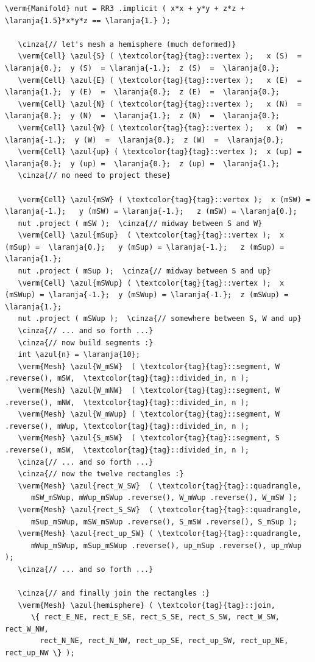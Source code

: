 \begin{Verbatim}[commandchars=\\\{\},formatcom=\small\tt,frame=single,
   label=parag-\ref{\numb section 2.\numb parag 7}.cpp,rulecolor=\color{moldura},
   baselinestretch=0.94,framesep=2mm]
   \verm{Manifold} nut = RR3 .implicit ( x*x + y*y + z*z + \laranja{1.5}*x*y*z == \laranja{1.} );

   \cinza{// let's mesh a hemisphere (much deformed)}
   \verm{Cell} \azul{S} ( \textcolor{tag}{tag}::vertex );   x (S)  =  \laranja{0.};  y (S)  = \laranja{-1.};  z (S)  =  \laranja{0.};
   \verm{Cell} \azul{E} ( \textcolor{tag}{tag}::vertex );   x (E)  =  \laranja{1.};  y (E)  =  \laranja{0.};  z (E)  =  \laranja{0.};
   \verm{Cell} \azul{N} ( \textcolor{tag}{tag}::vertex );   x (N)  =  \laranja{0.};  y (N)  =  \laranja{1.};  z (N)  =  \laranja{0.};
   \verm{Cell} \azul{W} ( \textcolor{tag}{tag}::vertex );   x (W)  = \laranja{-1.};  y (W)  =  \laranja{0.};  z (W)  =  \laranja{0.};
   \verm{Cell} \azul{up} ( \textcolor{tag}{tag}::vertex );  x (up) =  \laranja{0.};  y (up) =  \laranja{0.};  z (up) =  \laranja{1.};
   \cinza{// no need to project these}

   \verm{Cell} \azul{mSW} ( \textcolor{tag}{tag}::vertex );  x (mSW) = \laranja{-1.};   y (mSW) = \laranja{-1.};   z (mSW) = \laranja{0.};
   nut .project ( mSW );  \cinza{// midway between S and W}
   \verm{Cell} \azul{mSup}  ( \textcolor{tag}{tag}::vertex );  x (mSup) =  \laranja{0.};   y (mSup) = \laranja{-1.};   z (mSup) = \laranja{1.};
   nut .project ( mSup );  \cinza{// midway between S and up}
   \verm{Cell} \azul{mSWup} ( \textcolor{tag}{tag}::vertex );  x (mSWup) = \laranja{-1.};  y (mSWup) = \laranja{-1.};  z (mSWup) = \laranja{1.};
   nut .project ( mSWup );  \cinza{// somewhere between S, W and up}
   \cinza{// ... and so forth ...}
   \cinza{// now build segments :}
   int \azul{n} = \laranja{10};
   \verm{Mesh} \azul{W_mSW}  ( \textcolor{tag}{tag}::segment, W .reverse(), mSW,  \textcolor{tag}{tag}::divided_in, n );
   \verm{Mesh} \azul{W_mNW}  ( \textcolor{tag}{tag}::segment, W .reverse(), mNW,  \textcolor{tag}{tag}::divided_in, n );
   \verm{Mesh} \azul{W_mWup} ( \textcolor{tag}{tag}::segment, W .reverse(), mWup, \textcolor{tag}{tag}::divided_in, n );
   \verm{Mesh} \azul{S_mSW}  ( \textcolor{tag}{tag}::segment, S .reverse(), mSW,  \textcolor{tag}{tag}::divided_in, n );
   \cinza{// ... and so forth ...}
   \cinza{// now the twelve rectangles :}
   \verm{Mesh} \azul{rect_W_SW}  ( \textcolor{tag}{tag}::quadrangle,
      mSW_mSWup, mWup_mSWup .reverse(), W_mWup .reverse(), W_mSW );
   \verm{Mesh} \azul{rect_S_SW}  ( \textcolor{tag}{tag}::quadrangle,
      mSup_mSWup, mSW_mSWup .reverse(), S_mSW .reverse(), S_mSup );
   \verm{Mesh} \azul{rect_up_SW} ( \textcolor{tag}{tag}::quadrangle,
      mWup_mSWup, mSup_mSWup .reverse(), up_mSup .reverse(), up_mWup );
   \cinza{// ... and so forth ...}

   \cinza{// and finally join the rectangles :}
   \verm{Mesh} \azul{hemisphere} ( \textcolor{tag}{tag}::join,
      \{ rect_E_NE, rect_E_SE, rect_S_SE, rect_S_SW, rect_W_SW, rect_W_NW,
        rect_N_NE, rect_N_NW, rect_up_SE, rect_up_SW, rect_up_NE, rect_up_NW \} );
\end{Verbatim}

